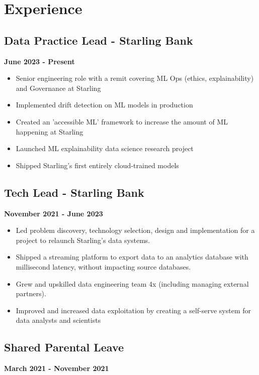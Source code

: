 \documentclass[a4paper]{scrartcl}
\begin{document}
\section*{Experience}

\subsection*{Data Practice Lead - Starling Bank}
\textbf{June 2023 - Present}
\begin{itemize}
      \item Senior engineering role with a remit covering ML Ops
            (ethics,
            explainability) and Governance at Starling
      \item Implemented drift detection on ML models in production
      \item Created an 'accessible ML' framework to increase the amount of ML
            happening at Starling
      \item Launched ML explainability data science research project
      \item Shipped Starling's first entirely cloud-trained models
\end{itemize}

\subsection*{Tech Lead - Starling Bank}
\textbf{November 2021 - June 2023}
\begin{itemize}
      \item Led problem discovery, technology selection, design and
            implementation for a project to relaunch Starling's data systems.
      \item Shipped a streaming platform to export data to an analytics
            database
            with millisecond latency, without impacting source databases.
      \item Grew and upskilled data engineering team 4x (including managing
            external partners).
      \item Improved and increased data exploitation by creating a self-serve
            system for data analysts and scientists
\end{itemize}

\subsection*{Shared Parental Leave}
\textbf{March 2021 - November 2021}
\end{document}
